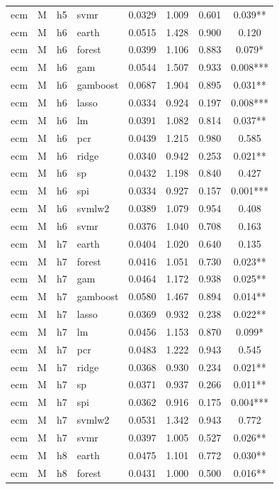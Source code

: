 \begin{ThreePartTable}
\begin{longtable}[t]{llclcccc}
ecm & M & h5 & svmr & 0.0329 & 1.009 & 0.601 & 0.039**\\
\addlinespace
ecm & M & h6 & earth & 0.0515 & 1.428 & 0.900 & 0.120\\
ecm & M & h6 & forest & 0.0399 & 1.106 & 0.883 & 0.079*\\
ecm & M & h6 & gam & 0.0544 & 1.507 & 0.933 & 0.008***\\
ecm & M & h6 & gamboost & 0.0687 & 1.904 & 0.895 & 0.031**\\
ecm & M & h6 & lasso & 0.0334 & 0.924 & 0.197 & 0.008***\\
ecm & M & h6 & lm & 0.0391 & 1.082 & 0.814 & 0.037**\\
ecm & M & h6 & pcr & 0.0439 & 1.215 & 0.980 & 0.585\\
ecm & M & h6 & ridge & 0.0340 & 0.942 & 0.253 & 0.021**\\
ecm & M & h6 & sp & 0.0432 & 1.198 & 0.840 & 0.427\\
ecm & M & h6 & spi & 0.0334 & 0.927 & 0.157 & 0.001***\\
ecm & M & h6 & svmlw2 & 0.0389 & 1.079 & 0.954 & 0.408\\
ecm & M & h6 & svmr & 0.0376 & 1.040 & 0.708 & 0.163\\
\addlinespace
ecm & M & h7 & earth & 0.0404 & 1.020 & 0.640 & 0.135\\
ecm & M & h7 & forest & 0.0416 & 1.051 & 0.730 & 0.023**\\
ecm & M & h7 & gam & 0.0464 & 1.172 & 0.938 & 0.025**\\
ecm & M & h7 & gamboost & 0.0580 & 1.467 & 0.894 & 0.014**\\
ecm & M & h7 & lasso & 0.0369 & 0.932 & 0.238 & 0.022**\\
ecm & M & h7 & lm & 0.0456 & 1.153 & 0.870 & 0.099*\\
ecm & M & h7 & pcr & 0.0483 & 1.222 & 0.943 & 0.545\\
ecm & M & h7 & ridge & 0.0368 & 0.930 & 0.234 & 0.021**\\
ecm & M & h7 & sp & 0.0371 & 0.937 & 0.266 & 0.011**\\
ecm & M & h7 & spi & 0.0362 & 0.916 & 0.175 & 0.004***\\
ecm & M & h7 & svmlw2 & 0.0531 & 1.342 & 0.943 & 0.772\\
ecm & M & h7 & svmr & 0.0397 & 1.005 & 0.527 & 0.026**\\
\addlinespace
ecm & M & h8 & earth & 0.0475 & 1.101 & 0.772 & 0.030**\\
ecm & M & h8 & forest & 0.0431 & 1.000 & 0.500 & 0.016**\\

\end{longtable}
\end{ThreePartTable}
